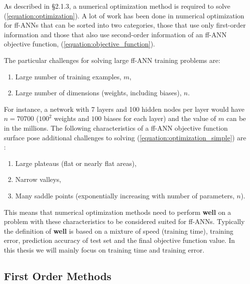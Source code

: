 \documentclass[letterpaper,12pt,titlepage,oneside,final]{book}
\begin{document}
	As described in \S{2.1.3}, a numerical optimization method is required to solve (\ref{equation:optimization}). A lot of work has been done in numerical optimization for ff-ANNs that can be sorted into two categories, those that use only first-order information and those that also use second-order information of an ff-ANN objective function, (\ref{equation:objective_function}). 
	
	The particular challenges for solving large ff-ANN training problems are:
	\begin{enumerate}
		\item {Large number of training examples, $m$,}
		\item {Large number of dimensions (weights, including biases), $n$. }
	\end{enumerate}
	For instance, a network with 7 layers and 100 hidden nodes per layer would have $n=70700$ ($100^{2}$ weights and $100$ biases for each layer) and the value of $m$ can be in the millions. The following characteristics of a ff-ANN objective function surface pose additional challenges to solving (\ref{equation:optimization_simple}) are \cite{Shepherd.1997}:
	\begin{enumerate}
		\item {Large plateaus (flat or nearly flat areas),}
		\item {Narrow valleys,}
		\item {Many saddle points (exponentially increasing with number of parameters, $n$).}
	\end{enumerate}
	This means that numerical optimization methods need to perform \textbf{well} on a problem with these characteristics to be considered suited for ff-ANNs. Typically the definition of \textbf{well} is based on a mixture of speed (training time), training error, prediction accuracy of test set and the final objective function value. In this thesis we will mainly focus on training time and training error.
	
	\subsection{First Order Methods}
	
\end{document}
